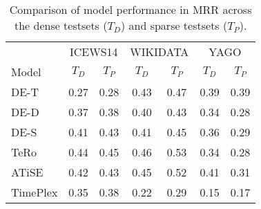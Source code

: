\begin{table}[htb]
\centering
\begin{minipage}{\columnwidthcaption}
\centering
\caption{Comparison of model performance in MRR across the dense testsets ($T_D$) and sparse testsets ($T_P$).}
\vspace{-3mm}

\begin{tabular}{l|cc|cc|cc}\hline
 & \multicolumn{2}{c|}{ICEWS14} & \multicolumn{2}{c|}{WIKIDATA}& \multicolumn{2}{c}{YAGO} \\
Model & $T_D$ & $T_P$ & $T_D$ & $T_P$ & $T_D$ & $T_P$ \\ \hline
DE-T   & 
0.27    & 0.28   &
0.43    & 0.47   &
0.39    & 0.39   \\
DE-D &
0.37    & 0.38   &
0.40    & 0.43   &
0.34    & 0.28   \\
DE-S   &
0.41    & 0.43   &
0.41    & 0.45   &
0.36    & 0.29   \\
TeRo        & 
0.44    & 0.45   &
0.46    & 0.53   &
0.34    & 0.28   \\
ATiSE       & 
0.42    & 0.43   &
0.45    & 0.52   &
0.41    & 0.31   \\
TimePlex    &
0.35    & 0.38   &
0.22    & 0.29   &
0.15    & 0.17   \\ \hline
\end{tabular}

\label{tab:time_density_comparison}
\end{minipage}
\end{table}

